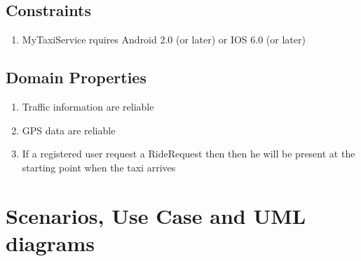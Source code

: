 \documentclass[11pt]{article} %
\begin{document}
    \subsection{Constraints}
	\begin{enumerate}
	      \item MyTaxiService rquires Android 2.0 (or later) or IOS 6.0 (or later)
	\end{enumerate}

    \subsection {Domain Properties}
	\begin{enumerate}
	      \item Traffic information are reliable
	      \item GPS data are reliable
	      \item If a registered user request a RideRequest then then he will be present at the starting point when the taxi arrives
	\end{enumerate}

\section {Scenarios, Use Case and UML diagrams}
\end{document}

